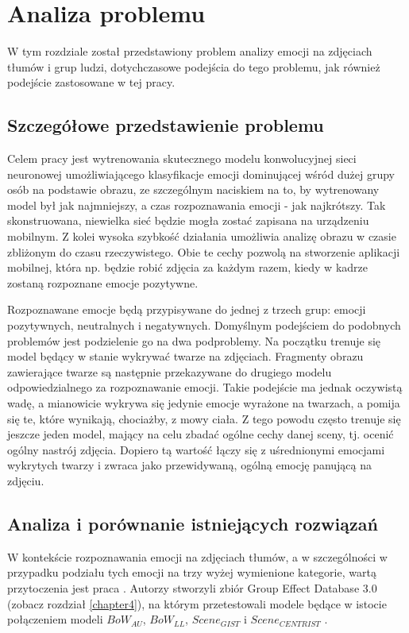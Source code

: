 \chapter{Analiza problemu}
\thispagestyle{chapterBeginStyle}
\label{chapter3}


W tym rozdziale został przedstawiony problem analizy emocji na zdjęciach tłumów i grup ludzi, dotychczasowe podejścia do tego problemu, jak również podejście zastosowane w tej pracy.


\section{Szczegółowe przedstawienie problemu}
Celem pracy jest wytrenowania skutecznego modelu konwolucyjnej sieci neuronowej umożliwiającego klasyfikacje emocji dominującej wśród dużej grupy osób na podstawie obrazu, ze szczególnym naciskiem na to, by wytrenowany model był jak najmniejszy, a czas rozpoznawania emocji - jak najkrótszy. Tak skonstruowana, niewielka sieć będzie mogła zostać zapisana na urządzeniu mobilnym. Z kolei wysoka szybkość działania umożliwia analizę obrazu w czasie zbliżonym do czasu rzeczywistego. Obie te cechy pozwolą na stworzenie aplikacji mobilnej, która np. będzie robić zdjęcia za każdym razem, kiedy w kadrze zostaną rozpoznane emocje pozytywne.

Rozpoznawane emocje będą przypisywane do jednej z trzech grup: emocji pozytywnych, neutralnych i negatywnych. Domyślnym podejściem do podobnych problemów jest podzielenie go na dwa podproblemy. Na początku trenuje się model będący w stanie wykrywać twarze na zdjęciach. Fragmenty obrazu zawierające twarze są następnie przekazywane do drugiego modelu odpowiedzialnego za rozpoznawanie emocji. Takie podejście ma jednak oczywistą wadę, a mianowicie wykrywa się jedynie emocje wyrażone na twarzach, a pomija się te, które wynikają, chociażby, z mowy ciała. Z tego powodu często trenuje się jeszcze jeden model, mający na celu zbadać ogólne cechy danej sceny, tj. ocenić ogólny nastrój zdjęcia. Dopiero tą wartość łączy się z uśrednionymi emocjami wykrytych twarzy i zwraca jako przewidywaną, ogólną emocję panującą na zdjęciu.
 
 
\section{Analiza i porównanie istniejących rozwiązań}
W kontekście rozpoznawania emocji na zdjęciach tłumów, a w szczególności w przypadku podziału tych emocji na trzy wyżej wymienione kategorie, wartą przytoczenia jest praca \cite{GAD}. Autorzy stworzyli zbiór Group Effect Database 3.0 (zobacz rozdział \ref{chapter4}), na którym przetestowali modele będące w istocie połączeniem modeli $BoW_{AU}$, $BoW_{LL}$, $Scene_{GIST}$ \cite{GIST} i $Scene_{CENTRIST}$ \cite{CENTRIST}.

